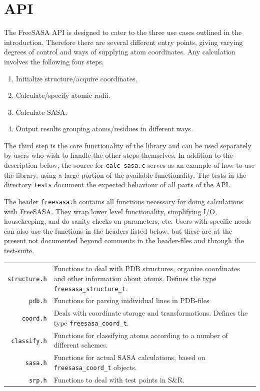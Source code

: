 \documentclass[a4paper,11pt]{article}
\begin{document}
\section{API} \label{sec:using}

The FreeSASA API is designed to cater to the three use cases outlined
in the introduction. Therefore there are several different entry
points, giving varying degrees of control and ways of supplying atom
coordinates. Any calculation involves the following four steps.
\begin{enumerate}
  \item Initialize structure/acquire coordinates.
  \item Calculate/specify atomic radii.
  \item Calculate SASA.
  \item Output results grouping atoms/residues in different ways.
\end{enumerate}
The third step is the core functionality of the library and can be
used separately by users who wish to handle the other steps
themselves. In addition to the description below, the source for
\texttt{calc\_sasa.c} serves as an example of how to use the library,
using a large portion of the available functionality. The tests in the
directory \verb|tests| document the expected behaviour of all parts of
the API.

The header \texttt{freesasa.h} contains all functions necessary for
doing calculations with FreeSASA. They wrap lower level functionality,
simplifying I/O, housekeeping, and do sanity checks on parameters,
etc. Users with specific needs can also use the functions in the
headers listed below, but these are at the present not documented
beyond comments in the header-files and through the test-suite.

\begin{tabular}{r>{\raggedright\arraybackslash}p{}}
\texttt{structure.h} & Functions to deal with PDB structures,  
                       organize coordinates and other information
                       about atoms. Defines the type 
                       \verb|freesasa_structure_t|.\\
\texttt{pdb.h} & Functions for parsing inidividual lines in PDB-files \\
\texttt{coord.h} & Deals with coordinate storage and transformations. Defines
                   the type \verb|freesasa_coord_t|.\\
\texttt{classify.h} & Functions for classifying atoms according
                      to a number of different schemes.\\
\texttt{sasa.h} & Functions for actual SASA calculations, based on
                  \verb|freesasa_coord_t| objects.\\
\texttt{srp.h} & Functions to deal with test points in S\&R. \\
\end{tabular}
\end{document}
